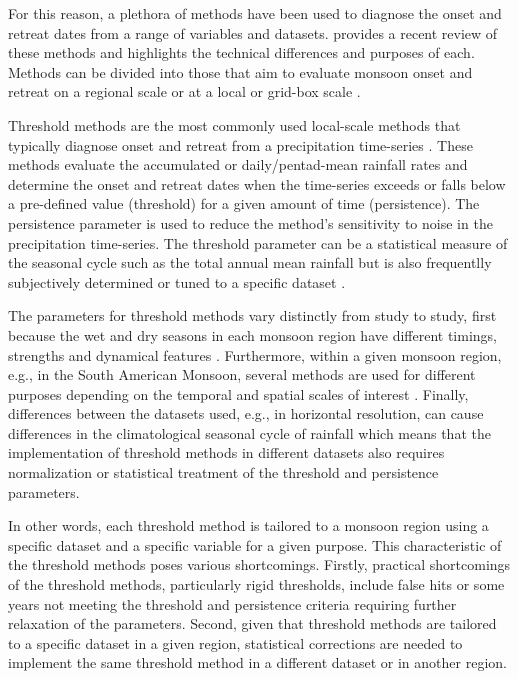 For this reason, a plethora of methods have been used to diagnose the onset and retreat dates from a range of variables and datasets.
\cite{bombardi2019} provides a recent review of these methods and highlights the technical differences and purposes of each. Methods can be divided into those that aim to evaluate monsoon onset and retreat on a regional scale \citep[e.g.][]{webster1992,fasullo2003,garcia2013}  or at a local or grid-box scale \citep[e.g.][]{liebmann2001interannual,cook2009}. 

Threshold methods are the most commonly used local-scale methods that typically diagnose onset and retreat from a precipitation time-series \citep{bombardi2019}. 
These methods evaluate the accumulated  \citep{liebmann2001interannual} or daily/pentad-mean rainfall rates \citep{geil2013} and determine the onset and retreat dates when the time-series exceeds or falls below a pre-defined value (threshold) for a given amount of time (persistence). The persistence parameter is used to reduce the method's sensitivity to noise in the precipitation time-series. The threshold parameter can be a statistical measure of the seasonal cycle such as the total annual mean rainfall \citep{arias2012} but is also frequentlly subjectively determined or tuned to a specific dataset \citep[e.g.][]{geil2013}.

The parameters for threshold methods vary distinctly from study to study, first because the wet and dry seasons in each monsoon region have different timings, strengths and dynamical features \citep{wang2017}.
Furthermore, within a given monsoon region,  e.g., in the South American Monsoon, several methods are used for different purposes depending on the temporal and spatial scales of interest \citep[see e.g.][]{liebmann2001interannual,marengo2001,nieto2011,carvalho2011,garcia2013}.
Finally, differences between the datasets used, e.g., in horizontal resolution, can cause differences in the climatological seasonal cycle of rainfall which means that the implementation of threshold methods in different datasets also requires normalization or statistical treatment of the threshold and persistence parameters.


In other words, each threshold method is tailored to a monsoon region using a specific dataset and a specific variable for a given purpose. This characteristic of the threshold methods poses various shortcomings.  
 Firstly, practical shortcomings of the threshold methods, particularly rigid thresholds, include false hits \citep{moron2014interannual} or some years not meeting the threshold and persistence criteria \citep{arias2012} requiring further relaxation of the parameters. Second, given that threshold methods are tailored to a specific dataset in a given region, statistical corrections are needed to implement the same threshold method in a different dataset or in another region. 
 
